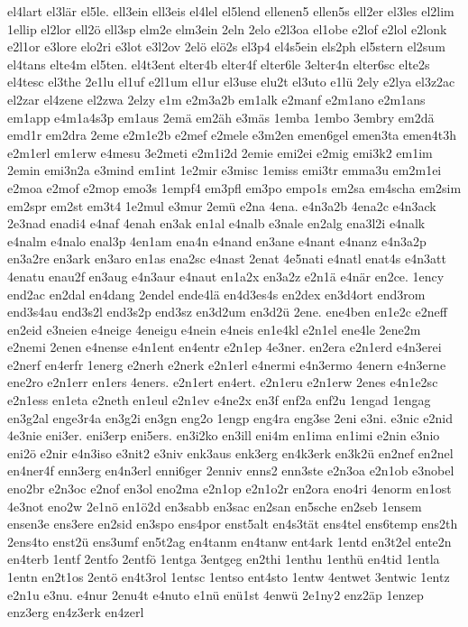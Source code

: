 {el4lart
el3lär
el5le.
ell3ein
ell3eis
el4lel
el5lend
ellenen5
ellen5s
ell2er
el3les
el2lim
1ellip
el2lor
ell2ö
ell3sp
elm2e
elm3ein
2eln
2elo
e2l3oa
el1obe
e2lof
e2lol
e2lonk
e2l1or
e3lore
elo2ri
e3lot
e3l2ov
2elö
elö2s
el3p4
el4s5ein
els2ph
el5stern
el2sum
el4tans
elte4m
el5ten.
el4t3ent
elter4b
elter4f
elter6le
3elter4n
elter6sc
elte2s
el4tesc
el3the
2e1lu
el1uf
e2l1um
el1ur
el3use
elu2t
el3uto
e1lü
2ely
e2lya
el3z2ac
el2zar
el4zene
el2zwa
2elzy
e1m
e2m3a2b
em1alk
e2manf
e2m1ano
e2m1ans
em1app
e4m1a4s3p
em1aus
2emä
em2äh
e3mäs
1emba
1embo
3embry
em2dä
emd1r
em2dra
2eme
e2m1e2b
e2mef
e2mele
e3m2en
emen6gel
emen3ta
emen4t3h
e2m1erl
em1erw
e4mesu
3e2meti
e2m1i2d
2emie
emi2ei
e2mig
emi3k2
em1im
2emin
emi3n2a
e3mind
em1int
1e2mir
e3misc
1emiss
emi3tr
emma3u
em2m1ei
e2moa
e2mof
e2mop
emo3s
1empf4
em3pfl
em3po
empo1s
em2sa
em4scha
em2sim
em2spr
em2st
em3t4
1e2mul
e3mur
2emü
e2na
4ena.
e4n3a2b
4ena2c
e4n3ack
2e3nad
enadi4
e4naf
4enah
en3ak
en1al
e4nalb
e3nale
en2alg
ena3l2i
e4nalk
e4nalm
e4nalo
enal3p
4en1am
ena4n
e4nand
en3ane
e4nant
e4nanz
e4n3a2p
en3a2re
en3ark
en3aro
en1as
ena2sc
e4nast
2enat
4e5nati
e4natl
enat4s
e4n3att
4enatu
enau2f
en3aug
e4n3aur
e4naut
en1a2x
en3a2z
e2n1ä
e4när
en2ce.
1ency
end2ac
en2dal
en4dang
2endel
ende4lä
en4d3es4s
en2dex
en3d4ort
end3rom
end3s4au
end3s2l
end3s2p
end3sz
en3d2um
en3d2ü
2ene.
ene4ben
en1e2c
e2neff
en2eid
e3neien
e4neige
4eneigu
e4nein
e4neis
en1e4kl
e2n1el
ene4le
2ene2m
e2nemi
2enen
e4nense
e4n1ent
en4entr
e2n1ep
4e3ner.
en2era
e2n1erd
e4n3erei
e2nerf
en4erfr
1energ
e2nerh
e2nerk
e2n1erl
e4nermi
e4n3ermo
4enern
e4n3erne
ene2ro
e2n1err
en1ers
4eners.
e2n1ert
en4ert.
e2n1eru
e2n1erw
2enes
e4n1e2sc
e2n1ess
en1eta
e2neth
en1eul
e2n1ev
e4ne2x
en3f
enf2a
enf2u
1engad
1engag
en3g2al
enge3r4a
en3g2i
en3gn
eng2o
1engp
eng4ra
eng3se
2eni
e3ni.
e3nic
e2nid
4e3nie
eni3er.
eni3erp
eni5ers.
en3i2ko
en3ill
eni4m
en1ima
en1imi
e2nin
e3nio
eni2ö
e2nir
e4n3iso
e3nit2
e3niv
enk3aus
enk3erg
en4k3erk
en3k2ü
en2nef
en2nel
en4ner4f
enn3erg
en4n3erl
enni6ger
2enniv
enns2
enn3ste
e2n3oa
e2n1ob
e3nobel
eno2br
e2n3oc
e2nof
en3ol
eno2ma
e2n1op
e2n1o2r
en2ora
eno4ri
4enorm
en1ost
4e3not
eno2w
2e1nö
en1ö2d
en3sabb
en3sac
en2san
en5sche
en2seb
1ensem
ensen3e
ens3ere
en2sid
en3spo
ens4por
enst5alt
en4s3tät
ens4tel
ens6temp
ens2th
2ens4to
enst2ü
ens3umf
en5t2ag
en4tanm
en4tanw
ent4ark
1entd
en3t2el
ente2n
en4terb
1entf
2entfo
2entfö
1entga
3entgeg
en2thi
1enthu
1enthü
en4tid
1entla
1entn
en2t1os
2entö
en4t3rol
1entsc
1entso
ent4sto
1entw
4entwet
3entwic
1entz
e2n1u
e3nu.
e4nur
2enu4t
e4nuto
e1nü
enü1st
4enwü
2e1ny2
enz2äp
1enzep
enz3erg
en4z3erk
en4zerl
}
